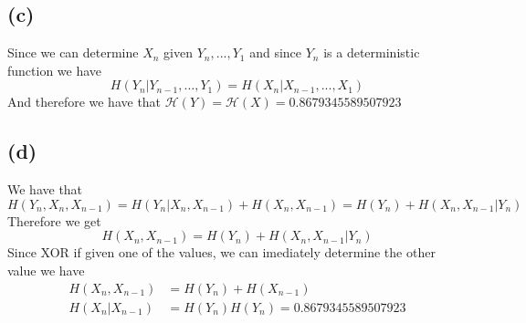 \subsection*{(c)}
Since we can determine $X_n$ given $Y_n,...,Y_1$ and since 
$Y_n$ is a deterministic function we have
$$H(Y_n|Y_{n-1},\dots,Y_1)=H(X_{n}|X_{n-1},...,X_1)$$
And therefore we have that 
$\mathcal{H}(Y)=\mathcal{H}(X)=\boxed{0.8679345589507923}$
\subsection*{(d)}
We have that 
$$H(Y_n,X_n,X_{n-1})=H(Y_n|X_n,X_{n-1})+H(X_n,X_{n-1})=H(Y_n)+H(X_n,X_{n-1}|Y_n)$$
Therefore we get 
$$H(X_n,X_{n-1})=H(Y_n)+H(X_n,X_{n-1}|Y_n)$$
Since XOR if given one of the values, we can imediately determine the other
value we have 
\begin{align*}
    H(X_n,X_{n-1})&=H(Y_n)+H(X_{n-1})\\
    H(X_n|X_{n-1})&=H(Y_n)
    H(Y_n)=\boxed{0.8679345589507923}
\end{align*}



